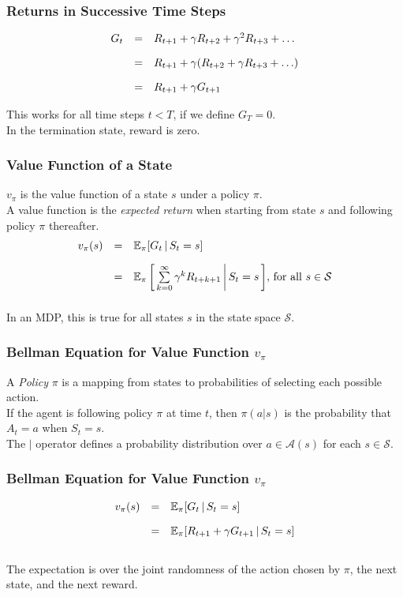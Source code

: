 \documentclass[12pt]{beamer}
\newcommand{\nl}{\vspace*{1em}\\}
\newcommand{\vsp}{\vspace*{1em}}
\begin{document}
\begin{frame}\frametitle{Returns in Successive Time Steps}
    $$
    \begin{array}{rll}
        G_t &=& R_{t+1} + \gamma R_{t+2} + \gamma^2 R_{t+3} + \ldots \nl
            &=& R_{t+1} + \gamma (R_{t+2} + \gamma R_{t+3} + \ldots) \nl
            &=& R_{t+1} + \gamma G_{t+1}
    \end{array}
    $$

    This works for all time steps $t < T$, if we define $G_T = 0$. \nl
    In the termination state, reward is zero.
\end{frame}



\begin{frame}\frametitle{Value Function of a State}
    $v_\pi$ is the value function of a state $s$ under a policy $\pi$.\nl
    A value function is the \textit{expected return} when starting from state
    $s$ and following policy $\pi$ thereafter.\nl

    $$
    \begin{array}{rll}
        v_\pi(s) &=& \mathbb{E}_\pi [G_{t} \,|\, S_t = s]\nl
            & = & \mathbb{E}_\pi \left[\, \sum\limits_{k=0}^{\infty} \gamma^{k} R_{t+k+1} \,\middle|\, S_t = s \,\right]\!,\,\mathrm{for \ all \ } s \in \mathcal{S}  \nl
    \end{array}
    $$
    \vsp
    In an MDP, this is true for all states $s$ in the state space $\mathcal{S}$.

\end{frame}


\begin{frame}\frametitle{Bellman Equation for Value Function $v_\pi$}
    A \textit{Policy} $\pi$ is a mapping from states to probabilities of selecting each possible action.\nl

    If the agent is following policy $\pi$ at time $t$, then $\pi(a|s)$ is the probability that $A_t = a$ when $S_t = s$.\nl

    The $\mid$ operator defines a probability distribution over $a \in \mathcal{A}(s)$ for each $s \in \mathcal{S}$.\nl

\end{frame}

\begin{frame}\frametitle{Bellman Equation for Value Function $v_\pi$}
    $$
    \noindent\begin{array}{lll}
        v_\pi(s) &=& \mathbb{E}_\pi [G_{t} \,|\, S_t = s]\nl
            &=&  \mathbb{E}_\pi [R_{t+1} + \gamma G_{t+1} \,|\, S_t = s] \nl
    \end{array}
    $$

    The expectation is over the joint randomness of the action chosen by $\pi$, the next state, and the next reward.
\end{frame}
\end{document}

